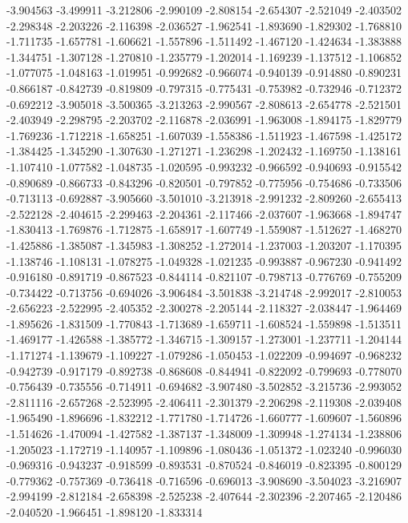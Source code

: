 -3.904563
-3.499911
-3.212806
-2.990109
-2.808154
-2.654307
-2.521049
-2.403502
-2.298348
-2.203226
-2.116398
-2.036527
-1.962541
-1.893690
-1.829302
-1.768810
-1.711735
-1.657781
-1.606621
-1.557896
-1.511492
-1.467120
-1.424634
-1.383888
-1.344751
-1.307128
-1.270810
-1.235779
-1.202014
-1.169239
-1.137512
-1.106852
-1.077075
-1.048163
-1.019951
-0.992682
-0.966074
-0.940139
-0.914880
-0.890231
-0.866187
-0.842739
-0.819809
-0.797315
-0.775431
-0.753982
-0.732946
-0.712372
-0.692212
-3.905018
-3.500365
-3.213263
-2.990567
-2.808613
-2.654778
-2.521501
-2.403949
-2.298795
-2.203702
-2.116878
-2.036991
-1.963008
-1.894175
-1.829779
-1.769236
-1.712218
-1.658251
-1.607039
-1.558386
-1.511923
-1.467598
-1.425172
-1.384425
-1.345290
-1.307630
-1.271271
-1.236298
-1.202432
-1.169750
-1.138161
-1.107410
-1.077582
-1.048735
-1.020595
-0.993232
-0.966592
-0.940693
-0.915542
-0.890689
-0.866733
-0.843296
-0.820501
-0.797852
-0.775956
-0.754686
-0.733506
-0.713113
-0.692887
-3.905660
-3.501010
-3.213918
-2.991232
-2.809260
-2.655413
-2.522128
-2.404615
-2.299463
-2.204361
-2.117466
-2.037607
-1.963668
-1.894747
-1.830413
-1.769876
-1.712875
-1.658917
-1.607749
-1.559087
-1.512627
-1.468270
-1.425886
-1.385087
-1.345983
-1.308252
-1.272014
-1.237003
-1.203207
-1.170395
-1.138746
-1.108131
-1.078275
-1.049328
-1.021235
-0.993887
-0.967230
-0.941492
-0.916180
-0.891719
-0.867523
-0.844114
-0.821107
-0.798713
-0.776769
-0.755209
-0.734422
-0.713756
-0.694026
-3.906484
-3.501838
-3.214748
-2.992017
-2.810053
-2.656223
-2.522995
-2.405352
-2.300278
-2.205144
-2.118327
-2.038447
-1.964469
-1.895626
-1.831509
-1.770843
-1.713689
-1.659711
-1.608524
-1.559898
-1.513511
-1.469177
-1.426588
-1.385772
-1.346715
-1.309157
-1.273001
-1.237711
-1.204144
-1.171274
-1.139679
-1.109227
-1.079286
-1.050453
-1.022209
-0.994697
-0.968232
-0.942739
-0.917179
-0.892738
-0.868608
-0.844941
-0.822092
-0.799693
-0.778070
-0.756439
-0.735556
-0.714911
-0.694682
-3.907480
-3.502852
-3.215736
-2.993052
-2.811116
-2.657268
-2.523995
-2.406411
-2.301379
-2.206298
-2.119308
-2.039408
-1.965490
-1.896696
-1.832212
-1.771780
-1.714726
-1.660777
-1.609607
-1.560896
-1.514626
-1.470094
-1.427582
-1.387137
-1.348009
-1.309948
-1.274134
-1.238806
-1.205023
-1.172719
-1.140957
-1.109896
-1.080436
-1.051372
-1.023240
-0.996030
-0.969316
-0.943237
-0.918599
-0.893531
-0.870524
-0.846019
-0.823395
-0.800129
-0.779362
-0.757369
-0.736418
-0.716596
-0.696013
-3.908690
-3.504023
-3.216907
-2.994199
-2.812184
-2.658398
-2.525238
-2.407644
-2.302396
-2.207465
-2.120486
-2.040520
-1.966451
-1.898120
-1.833314
